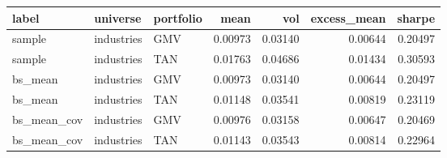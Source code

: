 \begin{tabular}{lllrrrr}
\toprule
label & universe & portfolio & mean & vol & excess\_mean & sharpe \\
\midrule
sample & industries & GMV & 0.00973 & 0.03140 & 0.00644 & 0.20497 \\
sample & industries & TAN & 0.01763 & 0.04686 & 0.01434 & 0.30593 \\
bs\_mean & industries & GMV & 0.00973 & 0.03140 & 0.00644 & 0.20497 \\
bs\_mean & industries & TAN & 0.01148 & 0.03541 & 0.00819 & 0.23119 \\
bs\_mean\_cov & industries & GMV & 0.00976 & 0.03158 & 0.00647 & 0.20469 \\
bs\_mean\_cov & industries & TAN & 0.01143 & 0.03543 & 0.00814 & 0.22964 \\
\bottomrule
\end{tabular}
